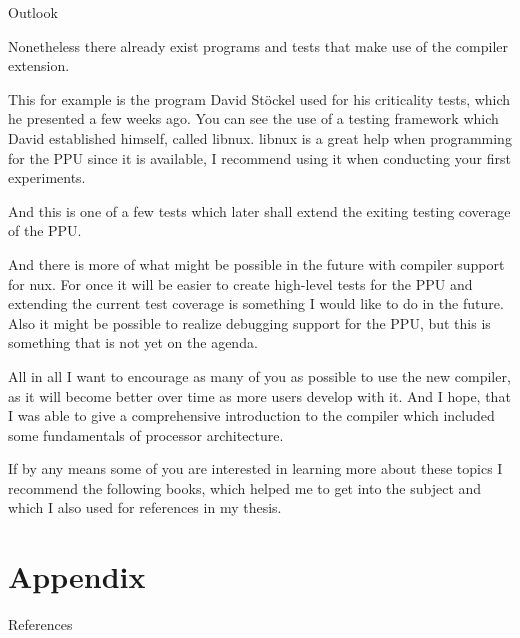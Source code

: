 \documentclass[10pt,aspectratio=169]{beamer}
\begin{document}
\begin{frame}[fragile]{Outlook}
{		Nonetheless there already exist programs and tests that make use of the compiler extension.

		This for example is the program David Stöckel used for his criticality tests, which he presented a few weeks ago.
		You can see the use of a testing framework which David established himself, called libnux.
		libnux is a great help when programming for the PPU since it is available, I recommend using it when conducting your first experiments.

		And this is one of a few tests which later shall extend the exiting testing coverage of the PPU.

		And there is more of what might be possible in the future with compiler support for nux.
		For once it will be easier to create high-level tests for the PPU and extending the current test coverage is something I would like to do in the future.
		Also it might be possible to realize debugging support for the PPU, but this is something that is not yet on the agenda.

		All in all I want to encourage as many of you as possible to use the new compiler, as it will become better over time as more users develop with it.
		And I hope, that I was able to give a comprehensive introduction to the compiler which included some fundamentals of processor architecture.

		If by any means some of you are interested in learning more about these topics I recommend the following books, which helped me to get into the subject and which I also used for references in my thesis.
		
}
\end{frame}

\appendix



\section{Appendix}
\nocite{PPU}
\nocite{microprocessor}
\nocite{UBHD-67548259}
\nocite{UBHD-66483012}
\nocite{nuxmanual}
\nocite{GCCint}

\begin{frame}[fragile]{References}
	\vspace*{3em}
	{\scriptsize
	\printbibliography}
\end{frame}
\end{document}
